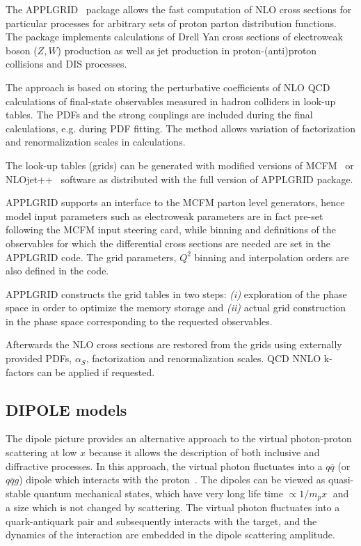 The APPLGRID~\cite{Carli:2010rw} package allows the fast computation 
of NLO cross sections for particular processes for arbitrary sets of 
proton parton distribution functions. The package implements
calculations of Drell Yan cross sections of electroweak boson (\(Z,W\))
production as well as jet production in proton-(anti)proton
collisions and DIS processes. 

The approach is based on storing the perturbative coefficients
of NLO QCD calculations of final-state observables measured
in hadron colliders in look-up tables. The PDFs and the 
strong couplings are included during the final calculations,
e.g. during PDF fitting. The method allows 
variation of factorization and renormalization scales in
calculations.

The look-up tables (grids) can be generated with modified versions
of MCFM~\cite{Campbell:1999ah,Campbell:2010ff} or 
NLOjet++~\cite{Nagy:2001fj} software as distributed
with the full version of APPLGRID package.

APPLGRID supports an interface to the MCFM parton level generators,
hence model input parameters such as electroweak parameters
are in fact pre-set following the MCFM input steering card, while
binning and definitions of the observables for which the
differential cross sections are needed are set in the 
APPLGRID code. 
The grid parameters, \(Q^2\) binning
and interpolation orders are also defined in the code.

APPLGRID constructs the grid tables in two 
steps: {\it (i)} exploration of the phase space in order
to optimize the memory storage and {\it (ii)} actual grid
construction in the phase space corresponding to the 
requested observables.

Afterwards the NLO cross sections are restored from the grids
using externally provided PDFs, \(\alpha_S\), factorization and 
renormalization scales. QCD NNLO k-factors can be applied
if requested.

\subsection{DIPOLE models}

The dipole picture provides an alternative approach to the virtual photon-proton
 scattering at low $x$  because it allows the description of both inclusive and 
diffractive processes.
 In this approach, the virtual photon fluctuates into a $q\bar q$ (or $q\bar q g$) 
 dipole which interacts with the proton~\cite{NNZ:91}.  
The dipoles can be viewed as quasi-stable quantum mechanical states, which have very long 
life time $\propto 1/m_p x\;$ and a size which is not changed by scattering.
The virtual photon fluctuates into a quark-antiquark pair and subsequently interacts with the target, 
and the dynamics of the interaction are embedded in the dipole scattering amplitude.

